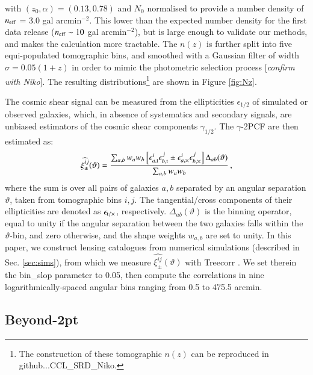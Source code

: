 \documentclass[useAMS,usenatbib]{mn2e}
\begin{document}
with $(z_0, \alpha) = (0.13, 0.78)$ and $N_0$ normalised to provide a number density of $n_{\rm eff}$ = 3.0 gal arcmin$^{-2}$. This lower than the expected number density for the first data release ($n_{\rm eff}\sim10$ gal arcmin$^{-2}$), but is large enough to validate our methods, and makes the calculation more tractable. The $n(z)$ is further split into five equi-populated tomographic bins, and smoothed with a Gaussian filter of width $\sigma = 0.05(1+z)$ in order to mimic the photometric selection process [{\it confirm with Niko}].  The resulting distributions\footnote{The construction of these tomographic $n(z)$ can be reproduced in {github...CCL\_SRD\_Niko}.} are shown in Figure \ref{fig:Nz}. 

The cosmic shear signal can be measured from the ellipticities $\epsilon_{1/2}$ of simulated or observed galaxies, which, in absence of systematics and secondary signals, are unbiased estimators  of the cosmic shear components $\gamma_{1/2}$. The $\gamma$-2PCF are then estimated as:
 \begin{eqnarray}
 \widehat{\xi_{\pm}^{ij}}(\vartheta) = \frac{\sum_{a,b} w_a w_b \left[\epsilon_{a, \rm t}^i\epsilon_{b, \rm t}^j     \pm \epsilon_{a, \times}^i\epsilon_{b, \times}^j    \right]\Delta_{ab}(\vartheta)}{\sum_{a,b} w_a w_b} \, ,
 \label{eq:2PCF_estimator}
  \end{eqnarray}
where the sum is over all pairs of galaxies $a,b$ separated by an angular separation $\vartheta$, taken from tomographic bins $i,j$. The tangential/cross components of their ellipticities are denoted as $\epsilon_{\rm t/\times}$, respectively. 
$\Delta_{ab}(\vartheta)$ is the binning operator, equal to unity if the angular separation between the two galaxies falls within the $\vartheta$-bin, and zero otherwise, and the shape weights $w_{a,b}$ are set to unity. In this paper, we construct lensing catalogues from numerical simulations (described in Sec. \ref{sec:sims}), from which we measure $ \widehat{\xi_{\pm}^{ij}}(\vartheta)$ with {\sc Treecorr} \citep{TreeCorr}. We set therein the {\sc bin\_slop} parameter to 0.05, then compute the correlations in nine logarithmically-spaced angular bins ranging from 0.5 to 475.5 arcmin. 
 
 
\subsection{Beyond-2pt}
\label{subsec:beyond-2pt}
\end{document}
